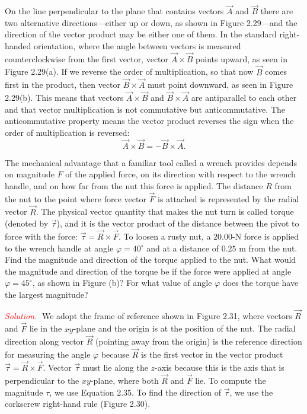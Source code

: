 \documentclass{report}
\begin{document}
    \bigbreak \noindent 
    On the line perpendicular to the plane that contains vectors $\vec{A}$ and $\vec{B}$ there are two alternative directions---either up or down, as shown in Figure 2.29---and the direction of the vector product may be either one of them. In the standard right-handed orientation, where the angle between vectors is measured counterclockwise from the first vector, vector $\vec{A} \times \vec{B}$ points upward, as seen in Figure 2.29(a). If we reverse the order of multiplication, so that now $\vec{B}$ comes first in the product, then vector $\vec{B} \times \vec{A}$ must point downward, as seen in Figure 2.29(b). This means that vectors $\vec{A} \times \vec{B}$ and $\vec{B} \times \vec{A}$ are antiparallel to each other and that vector multiplication is not commutative but anticommutative. The anticommutative property means the vector product reverses the sign when the order of multiplication is reversed:
    \[
        \vec{A} \times \vec{B} = -\vec{B} \times \vec{A}.
    \]
    \bigbreak \noindent 
    \begin{exm}
        The mechanical advantage that a familiar tool called a wrench provides depends on magnitude $F$ of the applied force, on its direction with respect to the wrench handle, and on how far from the nut this force is applied. The distance $R$ from the nut to the point where force vector $\vec{F}$ is attached is represented by the radial vector $\vec{R}$. The physical vector quantity that makes the nut turn is called torque (denoted by $\vec{\tau}$), and it is the vector product of the distance between the pivot to force with the force: $\vec{\tau} = \vec{R} \times \vec{F}$.
        \bigbreak \noindent 
        To loosen a rusty nut, a $20.00$-N force is applied to the wrench handle at angle $\varphi=40^\circ$ and at a distance of $0.25$ m from the nut. Find the magnitude and direction of the torque applied to the nut. What would the magnitude and direction of the torque be if the force were applied at angle $\varphi=45^\circ$, as shown in Figure (b)? For what value of angle $\varphi$ does the torque have the largest magnitude?
        \bigbreak \noindent 
    \end{exm}
    \bigbreak \noindent 
    \textcolor{red}{\textit{Solution.}}
    We adopt the frame of reference shown in Figure 2.31, where vectors $\vec{R}$ and $\vec{F}$ lie in the $xy$-plane and the origin is at the position of the nut. The radial direction along vector $\vec{R}$ (pointing away from the origin) is the reference direction for measuring the angle $\varphi$ because $\vec{R}$ is the first vector in the vector product $\vec{\tau} = \vec{R} \times \vec{F}$. Vector $\vec{\tau}$ must lie along the $z$-axis because this is the axis that is perpendicular to the $xy$-plane, where both $\vec{R}$ and $\vec{F}$ lie. To compute the magnitude $\tau$, we use Equation 2.35. To find the direction of $\vec{\tau}$, we use the corkscrew right-hand rule (Figure 2.30).
\end{document}
